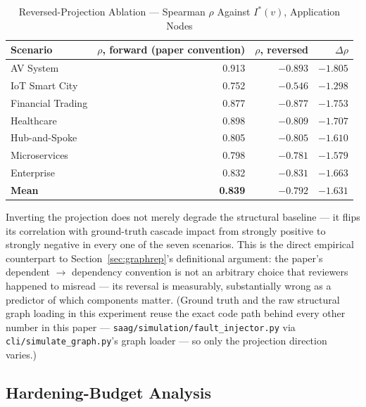 \documentclass[review]{elsarticle}
\begin{document}
\begin{table}[htbp]
\centering
\caption{Reversed-Projection Ablation --- Spearman $\rho$ Against $I^*(v)$, Application Nodes}
\label{tab:reversed}
\begin{tabular}{@{}lrrr@{}}
\toprule
Scenario & $\rho$, forward (paper convention) & $\rho$, reversed & $\Delta\rho$ \\
\midrule
AV System & 0.913 & $-0.893$ & $-1.805$ \\
IoT Smart City & 0.752 & $-0.546$ & $-1.298$ \\
Financial Trading & 0.877 & $-0.877$ & $-1.753$ \\
Healthcare & 0.898 & $-0.809$ & $-1.707$ \\
Hub-and-Spoke & 0.805 & $-0.805$ & $-1.610$ \\
Microservices & 0.798 & $-0.781$ & $-1.579$ \\
Enterprise & 0.832 & $-0.831$ & $-1.663$ \\
\midrule
\textbf{Mean} & \textbf{0.839} & \textbf{$-0.792$} & \textbf{$-1.631$} \\
\bottomrule
\end{tabular}
\end{table}

Inverting the projection does not merely degrade the structural baseline --- it flips its
correlation with ground-truth cascade impact from strongly positive to strongly negative in every
one of the seven scenarios. This is the direct empirical counterpart to
Section~\ref{sec:graphrep}'s definitional argument: the paper's dependent $\to$ dependency
convention is not an arbitrary choice that reviewers happened to misread --- its reversal is
measurably, substantially wrong as a predictor of which components matter. (Ground truth and the
raw structural graph loading in this experiment reuse the exact code path behind every other number
in this paper --- \texttt{saag/simulation/fault\_injector.py} via \texttt{cli/simulate\_graph.py}'s
graph loader --- so only the projection direction varies.)

\subsection{Hardening-Budget Analysis}
\label{sec:hardening}
\end{document}
